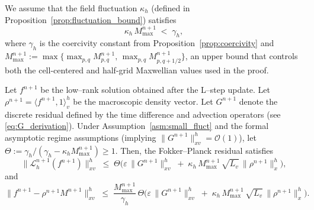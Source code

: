 \documentclass[10pt,a4paper]{amsart}
\begin{document}
\begin{assumption}\label{asm:small_fluct}
We assume that the field fluctuation $\kappa_h$ (defined in Proposition~\ref{prop:fluctuation_bound}) satisfies
\begin{equation}\label{eq:regime_condition}
    \kappa_h \, M_{\max}^{n+1} \;<\; \gamma_h,
\end{equation}
where $\gamma_h$ is the coercivity constant from Proposition~\ref{prop:coercivity} and $M_{\max}^{n+1} := \max\!\big\{ \max_{p,q} M_{p,q}^{n+1},\, \max_{p,q} M_{p,q+1/2}^{n+1}\big\}$, an upper bound that controls both the cell-centered and half-grid Maxwellian values used in the proof.
\end{assumption}

\begin{theorem}
\label{thm:main_AP}
Let $f^{n+1}$ be the low--rank solution obtained after the L--step update. Let $\rho^{n+1} = \langle f^{n+1}, 1 \rangle_v^h$ be the macroscopic density vector. Let $G^{n+1}$ denote the discrete residual defined by the time difference and advection operators (see \eqref{eq:G_derivation}). Under Assumption~\ref{asm:small_fluct} and the formal asymptotic regime assumptions (implying $\|G^{n+1}\|_{xv}^h = \mathcal{O}(1)$), let $\Theta := \gamma_h / (\gamma_h - \kappa_h M_{\max}^{n+1}) \ge 1$. Then, the Fokker--Planck residual satisfies
\begin{equation}\label{eq:residual_bound}
  \big\|\mathcal L_{h}^{n+1}(f^{n+1})\big\|_{xv}^h
  \;\le\;
  \Theta \Big( \varepsilon\,\|G^{n+1}\|_{xv}^h \;+\; \kappa_h\,M_{\max}^{n+1}\,\sqrt{L_v}\,\big\|\rho^{n+1}\big\|_x^h \Big),
\end{equation}
and 
\begin{equation}\label{eq:distance_bound}
  \big\|f^{n+1}-\rho^{n+1} M^{n+1}\big\|_{xv}^h
  \;\le\;
  \frac{M_{\max}^{n+1}}{\gamma_h}\,\Theta \Big( \varepsilon\,\|G^{n+1}\|_{xv}^h \;+\; \kappa_h\,M_{\max}^{n+1}\,\sqrt{L_v}\,\big\|\rho^{n+1}\big\|_x^h \Big).
\end{equation}
\end{theorem}
\end{document}
